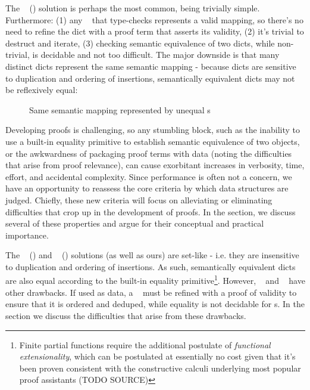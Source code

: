 \documentclass[nonacm]{acmart}
\theoremstyle{slplain}
\numberwithin{thm}{section}
\begin{document}
The \sal~ (\SAL) solution is perhaps the most common, being trivially simple. Furthermore:
 (1) any \SAL~ that type-checks represents a valid mapping,
       so there's no need to refine the dict with a proof term that asserts its validity,
 (2) it's trivial to destruct and iterate,
 (3) checking semantic equivalence of two dicts, while non-trivial, is decidable and not too difficult.
 The major downside is that many distinct dicts
represent the same semantic mapping - because dicts are sensitive to duplication and ordering
of insertions, semantically equivalent dicts may not be reflexively equal:
  \begin{figure}[H]
    \centering
    \caption{Same semantic mapping represented by unequal {\SAL}s}
    \label{fig:uneq}
  \end{figure}
Developing proofs is challenging, so any stumbling block, such as the inability to use a built-in equality
primitive to establish semantic equivalence of two objects, or the awkwardness of packaging
proof terms with data (noting the difficulties that arise from proof relevance), can cause exorbitant
increases in verbosity, time, effort, and accidental complexity. Since performance is often not a concern,
we have an opportunity to reassess the core criteria by which data structures are judged. Chiefly, these
new criteria will focus on alleviating or eliminating difficulties that crop up in the development of
proofs. In the  section, we discuss several of these properties and argue for their
conceptual and practical importance.

The \cal~ (\CAL) and \fpf~ (\FPF) solutions (as well as ours) are set-like - i.e. they are insensitive
to duplication and ordering of insertions. As such, semantically equivalent dicts are also equal according
to the built-in equality primitive\footnote{Finite partial functions require the additional postulate of
\emph{functional extensionality}, which can be postulated
at essentially no cost given that it's been proven consistent with the constructive calculi underlying most
popular proof assistants (TODO SOURCE)}. However, \CAL~ and \FPF~ have other drawbacks.
If used as data, a \CAL~ must be refined with a proof of validity to ensure that it is ordered and deduped,
while equality is not decidable for {\FPF}s. In the  section we discuss the difficulties
that arise from these drawbacks.
\end{document}
